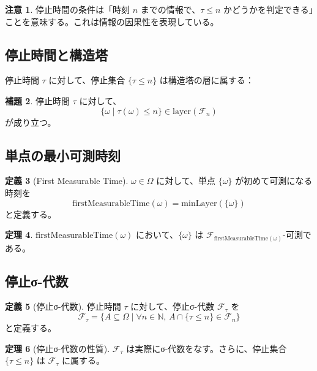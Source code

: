 \documentclass[a4paper,12pt]{article}
\theoremstyle{definition}
\newtheorem{definition}{定義}[section]
\newtheorem{theorem}[definition]{定理}
\newtheorem{lemma}[definition]{補題}
\newtheorem{remark}[definition]{注意}
\begin{document}
\begin{remark}
停止時間の条件は「時刻 $n$ までの情報で、$\tau \leq n$ かどうかを判定できる」ことを意味する。これは情報の因果性を表現している。
\end{remark}

\subsection{停止時間と構造塔}

停止時間 $\tau$ に対して、停止集合 $\{\tau \leq n\}$ は構造塔の層に属する：

\begin{lemma}
停止時間 $\tau$ に対して、
\[
\{\omega \mid \tau(\omega) \leq n\} \in \text{layer}(\mathcal{F}_n)
\]
が成り立つ。
\end{lemma}

\subsection{単点の最小可測時刻}

\begin{definition}[First Measurable Time]
$\omega \in \Omega$ に対して、単点 $\{\omega\}$ が初めて可測になる時刻を
\[
\text{firstMeasurableTime}(\omega) = \text{minLayer}(\{\omega\})
\]
と定義する。
\end{definition}

\begin{theorem}
$\text{firstMeasurableTime}(\omega)$ において、$\{\omega\}$ は $\mathcal{F}_{\text{firstMeasurableTime}(\omega)}$-可測である。
\end{theorem}

\subsection{停止σ-代数}

\begin{definition}[停止σ-代数]
停止時間 $\tau$ に対して、停止σ-代数 $\mathcal{F}_\tau$ を
\[
\mathcal{F}_\tau = \{A \subseteq \Omega \mid \forall n \in \mathbb{N}, \, A \cap \{\tau \leq n\} \in \mathcal{F}_n\}
\]
と定義する。
\end{definition}

\begin{theorem}[停止σ-代数の性質]
$\mathcal{F}_\tau$ は実際にσ-代数をなす。さらに、停止集合 $\{\tau \leq n\}$ は $\mathcal{F}_\tau$ に属する。
\end{theorem}
\end{document}
